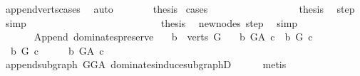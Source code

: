 \begin{isabellebody}
\ append{\isacharunderscore}{\kern0pt}verts{\isacharunderscore}{\kern0pt}cases\ \isamarkupfalse%
\ auto\isanewline
\ \ \ \ \isamarkupfalse%
\ \isamarkupfalse%
\ {\isacharquery}{\kern0pt}thesis\ \isamarkupfalse%
{\isacharparenleft}{\kern0pt}cases{\isacharparenright}{\kern0pt}\isanewline
\ \ \ \ \ \ \isamarkupfalse%
\ {}\isanewline
\ \ \ \ \ \ \isamarkupfalse%
\ \isamarkupfalse%
\ {\isacharquery}{\kern0pt}thesis\ \isamarkupfalse%
\ step\ \isamarkupfalse%
\ simp\isanewline
\ \ \ \ \ \ \isamarkupfalse%
\isanewline
\ \ \ \ \ \ \isamarkupfalse%
\ {}\isanewline
\ \ \ \ \ \ \ \ \isamarkupfalse%
\ \isamarkupfalse%
\ {\isacharquery}{\kern0pt}thesis\ \isamarkupfalse%
\ new{\isacharunderscore}{\kern0pt}nodes\ step\ \isamarkupfalse%
\ simp\isanewline
\ \ \ \ \ \ \isamarkupfalse%
\isanewline
\ \ \isamarkupfalse%
\ \isanewline
{}\isamarkupfalse%
%
\endisatagproof
{\isafoldproof}%
%
\isadelimproof
\ \ \ \ \isanewline
%
\endisadelimproof
\isanewline
{}\isamarkupfalse%
\ {\isacharparenleft}{\kern0pt}\ Append{\isacharparenright}{\kern0pt}\ dominates{\isacharunderscore}{\kern0pt}preserve{\isacharcolon}{\kern0pt}\isanewline
\ \ \ {\isachardoublequoteopen}b\ {\isasymin}\ verts\ G{\isachardoublequoteclose}\isanewline
\ \ \ {\isachardoublequoteopen}b\ {\isasymrightarrow}\isactrlbsub G{\isacharunderscore}{\kern0pt}A\isactrlesub \ c\ {\isasymlongleftrightarrow}\ b\ {\isasymrightarrow}\isactrlbsub G\isactrlesub \ c{\isachardoublequoteclose}\isanewline
%
\isadelimproof
%
\endisadelimproof
%
\isatagproof
{}\isamarkupfalse%
\ \ \isanewline
\ \ \isamarkupfalse%
\ {\isachardoublequoteopen}\ b\ {\isasymrightarrow}\isactrlbsub G\isactrlesub \ c{\isachardoublequoteclose}\isanewline
\ \ \isamarkupfalse%
\ \isamarkupfalse%
\ {\isachardoublequoteopen}b\ {\isasymrightarrow}\isactrlbsub G{\isacharunderscore}{\kern0pt}A\isactrlesub \ c{\isachardoublequoteclose}\isanewline
\ \ \ \ \isamarkupfalse%
\ append{\isacharunderscore}{\kern0pt}subgraph\ GG{\isacharunderscore}{\kern0pt}A\ dominates{\isacharunderscore}{\kern0pt}induce{\isacharunderscore}{\kern0pt}subgraphD\isanewline
\ \ \ \ \isamarkupfalse%
\ metis\ \ \ \ \isanewline

\end{isabellebody}

